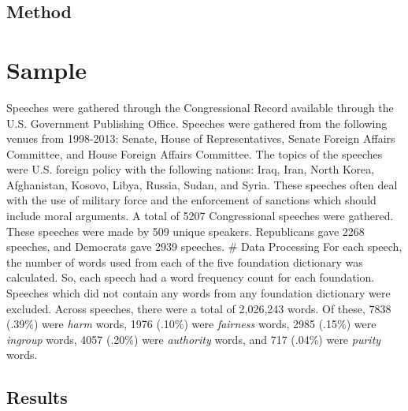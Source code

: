 \documentclass[english,man]{apa6}
\theoremstyle{definition}
\theoremstyle{definition}
\theoremstyle{definition}
\theoremstyle{remark}
\begin{document}
\subsection{Method}\label{method-2}

\section{Sample}\label{sample}

Speeches were gathered through the Congressional Record available
through the U.S. Government Publishing Office. Speeches were gathered
from the following venues from 1998-2013: Senate, House of
Representatives, Senate Foreign Affairs Committee, and House Foreign
Affairs Committee. The topics of the speeches were U.S. foreign policy
with the following nations: Iraq, Iran, North Korea, Afghanistan,
Kosovo, Libya, Russia, Sudan, and Syria. These speeches often deal with
the use of military force and the enforcement of sanctions which should
include moral arguments. A total of 5207 Congressional speeches were
gathered. These speeches were made by 509 unique speakers. Republicans
gave 2268 speeches, and Democrats gave 2939 speeches. \# Data Processing
For each speech, the number of words used from each of the five
foundation dictionary was calculated. So, each speech had a word
frequency count for each foundation. Speeches which did not contain any
words from any foundation dictionary were excluded. Across speeches,
there were a total of 2,026,243 words. Of these, 7838 (.39\%) were
\emph{harm} words, 1976 (.10\%) were \emph{fairness} words, 2985 (.15\%)
were \emph{ingroup} words, 4057 (.20\%) were \emph{authority} words, and
717 (.04\%) were \emph{purity} words.

\subsection{Results}\label{results-3}
\end{document}
